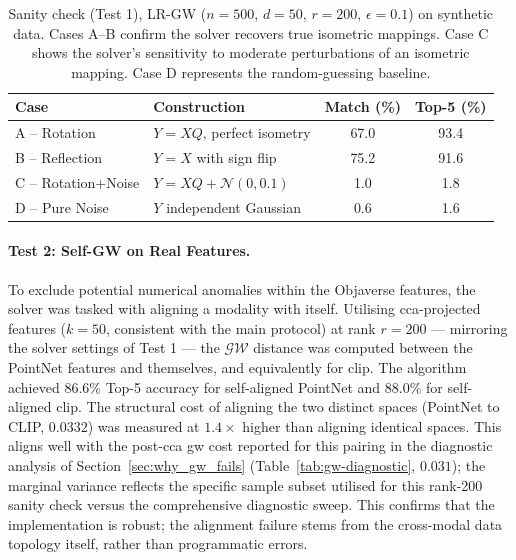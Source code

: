 \begin{table}[htpb]
\centering
\small
\begin{tabular}{llcc}
\toprule
\textbf{Case} & \textbf{Construction} & \textbf{Match (\%)} & \textbf{Top-5 (\%)} \\
\midrule
A -- Rotation       & $Y = XQ$, perfect isometry      & 67.0 & 93.4 \\
B -- Reflection     & $Y = X$ with sign flip          & 75.2 & 91.6 \\
C -- Rotation+Noise & $Y = XQ + \mathcal{N}(0, 0.1)$ &  1.0 &  1.8 \\
D -- Pure Noise     & $Y$ independent Gaussian        &  0.6 &  1.6 \\
\bottomrule
\end{tabular}
\caption{Sanity check (Test 1), LR-GW ($n=500$, $d=50$, $r=200$,
$\epsilon=0.1$) on synthetic data. Cases A--B confirm the solver recovers
true isometric mappings. Case C shows the solver's sensitivity to moderate
perturbations of an isometric mapping. Case D represents the random-guessing
baseline.}
\label{tab:sanity_check}
\end{table}

\paragraph{Test 2: Self-GW on Real Features.}
To exclude potential numerical anomalies within the Objaverse features, the solver was tasked with aligning a modality with itself. Utilising \gls{cca}-projected features ($k=50$, consistent with the main protocol) at rank $r=200$ --- mirroring the solver settings of Test 1 --- the $\mathcal{GW}$ distance was computed between the PointNet features and themselves, and equivalently for \gls{clip}. The algorithm achieved $86.6\%$ Top-5 accuracy for self-aligned PointNet and $88.0\%$ for self-aligned \gls{clip}. The structural cost of aligning the two distinct spaces (PointNet to CLIP, $0.0332$) was measured at $1.4\times$ higher than aligning identical spaces. This aligns well with the post-\gls{cca} \gls{gw} cost reported for this pairing in the diagnostic analysis of Section~\ref{sec:why_gw_fails} (Table~\ref{tab:gw-diagnostic}, $0.031$); the marginal variance reflects the specific sample subset utilised for this rank-200 sanity check versus the comprehensive diagnostic sweep. This confirms that the implementation is robust; the alignment failure stems from the cross-modal data topology itself, rather than programmatic errors.

